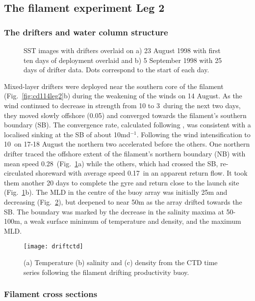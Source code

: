 \subsection{The filament experiment Leg 2}
\subsubsection{The drifters and water column structure}
\begin{figure}
\centering \arribacap%
%
%
\caption{SST images with drifters overlaid on a) 23 August 1998
with first ten days of deployment overlaid and b) 5 September 1998
with 25 days of drifter data. Dots correspond to the start of each
day.}
\label{fig:cd114drf_sat}%
\end{figure}
Mixed-layer drifters were deployed near the southern core of the
filament (Fig.~\ref{fig:cd114leg2}b) during the weakening of the
winds on 14 August. As the wind continued to decrease in strength
from 10 to 3\vel\, during the next two days, they moved slowly
offshore (0.05\vel) and converged towards the filament's southern
boundary (SB). The convergence rate, calculated following
\citet{Brink91b}, was consistent with a localised sinking at the
SB of about 10md$^{-1}$. Following the wind intensification to
10\vel\, on 17-18 August the northern two accelerated before the
others. One northern drifter traced the offshore extent of the
filament's northern boundary (NB) with mean speed 0.28\vel\,
(Fig.~\ref{fig:cd114drf_sat}a) while the others, which had crossed
the SB, re-circulated shoreward with average speed 0.17\vel\, in
an apparent return flow. It took them another 20 days to complete
the gyre and return close to the launch site
(Fig.~\ref{fig:cd114drf_sat}b). The MLD in the centre of the buoy
array was initially 25m and decreasing
(Fig.~\ref{fig:cd114driftctd}), but deepened to near 50m as the
array drifted towards the SB. The boundary was marked by the
decrease in the salinity maxima at 50-100m, a weak surface minimum
of temperature and density, and the maximum MLD.
\begin{figure} \centering
\texttt{[image: driftctd]}%
\caption{(a) Temperature (b) salinity and (c) density from the CTD
time series following the filament drifting productivity buoy.}%
\label{fig:cd114driftctd}%
\end{figure}
\subsubsection{Filament cross sections}

